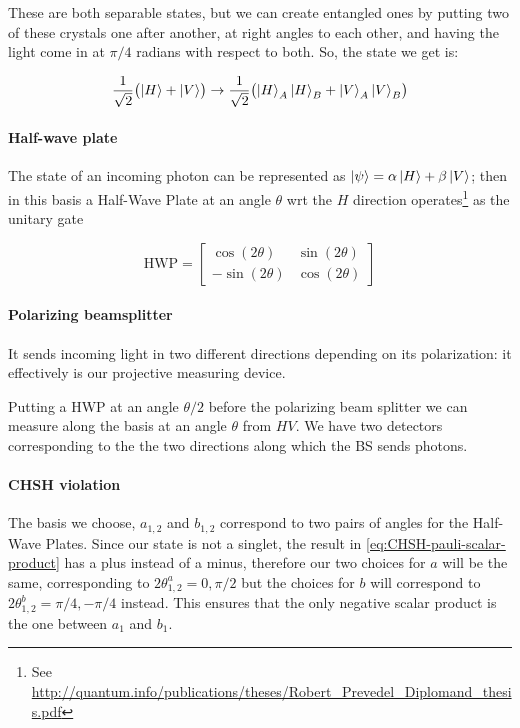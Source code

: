 \documentclass[main.tex]{subfiles}
\begin{document}
These are both separable states, but we can create entangled ones by putting two of these crystals one after another, at right angles to each other, and having the light come in at \(\pi/4\) radians with respect to both. So, the state we get is:

\begin{equation}
    \frac{1}{\sqrt{2} } \qty(\ket{H} + \ket{V} ) \rightarrow
    \frac{1}{\sqrt{2} } \qty(\ket{H}_A \ket{H}_B + \ket{V}_A \ket{V}_B )
\end{equation}

\paragraph{Half-wave plate}

The state of an incoming photon can be represented as \(\ket{\psi } = \alpha \ket{H} + \beta \ket{V} \); then in this basis a Half-Wave Plate at an angle \(\theta\) wrt the \(H\) direction operates\footnote{See \url{http://quantum.info/publications/theses/Robert_Prevedel_Diplomand_thesis.pdf}} as the unitary gate

\begin{equation}
    \text{HWP} = \begin{bmatrix}
    \cos(2 \theta )    &  \sin(2 \theta)  \\
      -\sin(2 \theta)  & \cos(2 \theta)
    \end{bmatrix}
\end{equation}

\paragraph{Polarizing beamsplitter}

It sends incoming light in two different directions depending on its polarization: it effectively is our projective measuring device.

Putting a HWP at an angle \(\theta/2\) before the polarizing beam splitter we can measure along the basis at an angle \(\theta\) from \(HV\). We have two detectors corresponding to the the two directions along which the BS sends photons.

\paragraph{CHSH violation}

The basis we choose, \(a_{1, 2}\) and \(b_{1, 2}\) correspond to two pairs of angles for the Half-Wave Plates. Since our state is not a singlet, the result in \eqref{eq:CHSH-pauli-scalar-product} has a plus instead of a minus, therefore our two choices for \(a\) will be the same, corresponding to \(2 \theta^a_{1, 2} = 0, \pi/2\) but the choices for \(b\) will correspond to \(2 \theta^b_{1,2} = \pi/4, -\pi/4\) instead.
This ensures that the only negative scalar product is the one between \(a_1\) and \(b_1\).
\end{document}
